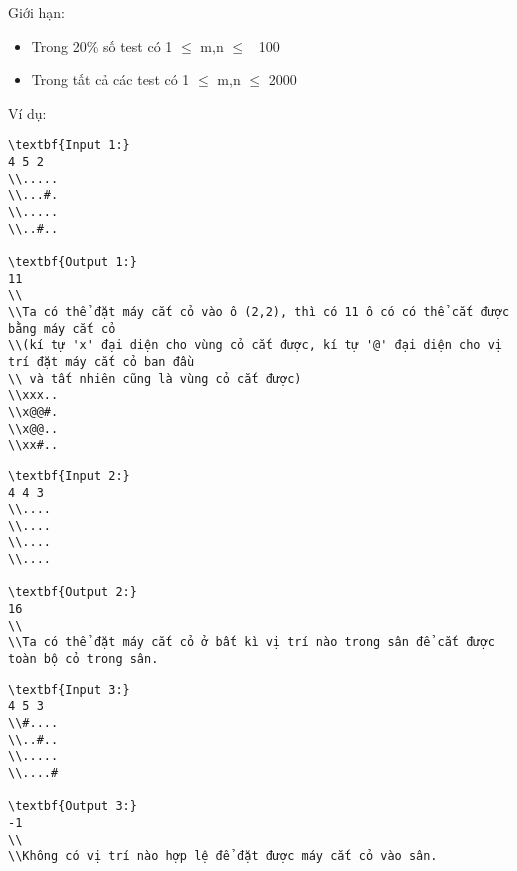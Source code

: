 Giới hạn:  
\begin{itemize}
	\item     Trong 20\% số test có 1  $\le$  m,n  $\le$  100   
	\item     Trong tất cả các test có 1  $\le$  m,n  $\le$  2000   
\end{itemize}
   Ví dụ:  
\begin{verbatim}
\textbf{Input 1:}
4 5 2
\\.....
\\...#.
\\.....
\\..#..

\textbf{Output 1:}
11
\\
\\Ta có thể đặt máy cắt cỏ vào ô (2,2), thì có 11 ô có có thể cắt được bằng máy cắt cỏ
\\(kí tự 'x' đại diện cho vùng cỏ cắt được, kí tự '@' đại diện cho vị trí đặt máy cắt cỏ ban đầu
\\ và tất nhiên cũng là vùng cỏ cắt được)
\\xxx..
\\x@@#.
\\x@@..
\\xx#..\end{verbatim}
\begin{verbatim}
\textbf{Input 2:}
4 4 3
\\....
\\....
\\....
\\....

\textbf{Output 2:}
16
\\
\\Ta có thể đặt máy cắt cỏ ở bất kì vị trí nào trong sân để cắt được toàn bộ cỏ trong sân.\end{verbatim}
\begin{verbatim}
\textbf{Input 3:}
4 5 3
\\#....
\\..#..
\\.....
\\....#

\textbf{Output 3:}
-1
\\
\\Không có vị trí nào hợp lệ để đặt được máy cắt cỏ vào sân.\end{verbatim}